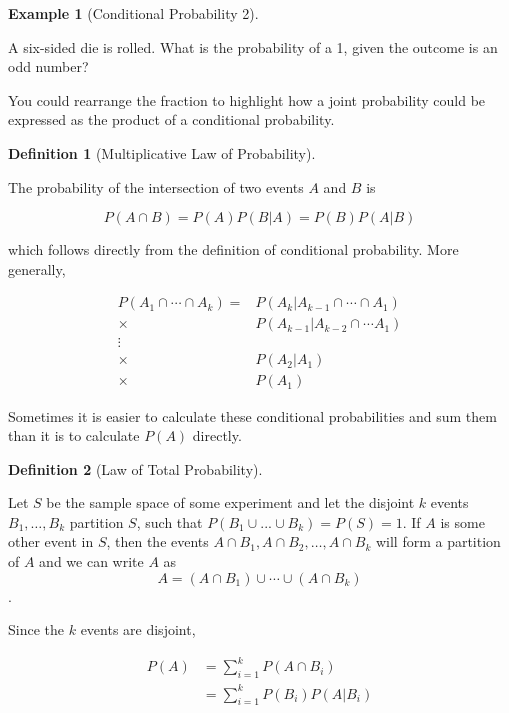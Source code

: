 \documentclass[
  letterpaper,
]{book}
\theoremstyle{definition}
\newtheorem{definition}{Definition}[chapter]
\theoremstyle{definition}
\newtheorem{example}{Example}[chapter]
\theoremstyle{plain}
\theoremstyle{definition}
\theoremstyle{plain}
\theoremstyle{plain}
\theoremstyle{remark}
\begin{document}
\leavevmode{}%
\begin{example}[Conditional Probability 2]\label{exm-condprobexm2}

A six-sided die is rolled. What is the probability of a 1, given the
outcome is an odd number?

\end{example}

You could rearrange the fraction to highlight how a joint probability
could be expressed as the product of a conditional probability.

\leavevmode{}%
\begin{definition}[Multiplicative Law of Probability]\label{def-}

The probability of the intersection of two events \(A\) and \(B\) is

\[P(A\cap B)=P(A)P(B|A)=P(B)P(A|B)\]

which follows directly from the definition of conditional probability.
More generally,

\begin{align*}
P(A_1\cap \cdots\cap A_k) = &P(A_k| A_{k-1}\cap \cdots \cap A_1) \\
\times &P(A_{k-1}|A_{k-2}\cap \cdots A_1) \\
\vdots & \\
\times &P(A_2|A_1) \\
\times &P(A_1)
\end{align*}

Sometimes it is easier to calculate these conditional probabilities and
sum them than it is to calculate \(P(A)\) directly.

\end{definition}

\leavevmode{}%
\begin{definition}[Law of Total Probability]\label{def-}

Let \(S\) be the sample space of some experiment and let the disjoint
\(k\) events \(B_1,\ldots,B_k\) partition \(S\), such that
\(P(B_1\cup ... \cup B_k) = P(S) = 1\). If \(A\) is some other event in
\(S\), then the events \(A\cap B_1, A\cap B_2, \ldots, A\cap B_k\) will
form a partition of \(A\) and we can write \(A\) as
\[A=(A\cap B_1)\cup\cdots\cup (A\cap B_k)\].

Since the \(k\) events are disjoint,

\begin{align*}
P(A)&=\sum\limits_{i=1}^k P(A \cap B_i)\\
    &=\sum\limits_{i=1}^k P(B_i)P(A|B_i)
\end{align*}

\end{definition}
\end{document}
